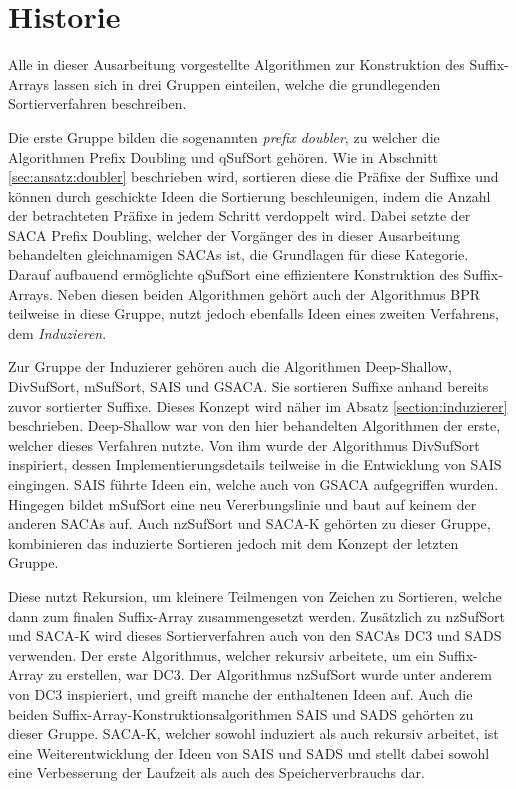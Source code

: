 \section{Historie}
Alle  in dieser Ausarbeitung vorgestellte Algorithmen zur Konstruktion des Suffix-Arrays lassen sich in drei Gruppen einteilen, welche die grundlegenden Sortierverfahren beschreiben. \par
Die erste Gruppe bilden die sogenannten \textit{prefix doubler}, zu welcher die Algorithmen Prefix Doubling und qSufSort gehören.
Wie in Abschnitt \ref{sec:ansatz:doubler} beschrieben wird, sortieren diese die Präfixe der Suffixe und können durch geschickte Ideen die Sortierung beschleunigen, indem die Anzahl der betrachteten Präfixe in jedem Schritt verdoppelt wird. 
Dabei setzte der SACA Prefix Doubling, welcher der Vorgänger des in dieser Ausarbeitung behandelten gleichnamigen SACAs ist, die Grundlagen für diese Kategorie.
Darauf aufbauend ermöglichte qSufSort eine effizientere Konstruktion des Suffix-Arrays. 
Neben diesen beiden Algorithmen gehört auch der Algorithmus BPR teilweise in diese Gruppe, nutzt jedoch ebenfalls Ideen eines zweiten Verfahrens, dem \textit{Induzieren}. \par

Zur Gruppe der Induzierer gehören auch die Algorithmen Deep-Shallow, DivSufSort, mSufSort, SAIS und GSACA.
Sie sortieren Suffixe anhand bereits zuvor sortierter Suffixe.
Dieses Konzept wird näher im Absatz \ref{section:induzierer} beschrieben.
Deep-Shallow war von den hier behandelten Algorithmen der erste, welcher dieses Verfahren nutzte.
Von ihm wurde der Algorithmus DivSufSort inspiriert, dessen Implementierungsdetails teilweise in die Entwicklung von SAIS eingingen.
SAIS führte Ideen ein, welche auch von GSACA aufgegriffen wurden.
Hingegen bildet mSufSort eine neu Vererbungslinie und baut auf keinem der anderen SACAs auf.
Auch nzSufSort und SACA-K gehörten zu dieser Gruppe, kombinieren das induzierte Sortieren jedoch mit dem Konzept der letzten Gruppe. \par

Diese nutzt Rekursion, um kleinere Teilmengen von Zeichen zu Sortieren, welche dann zum finalen Suffix-Array zusammengesetzt werden.
Zusätzlich zu nzSufSort und SACA-K wird dieses Sortierverfahren auch von den SACAs DC3 und SADS verwenden. 
Der erste Algorithmus, welcher rekursiv arbeitete, um ein Suffix-Array zu erstellen, war DC3.
Der Algorithmus nzSufSort wurde unter anderem von DC3 inspieriert, und greift manche der enthaltenen Ideen auf.
Auch die beiden Suffix-Array-Konstruktionsalgorithmen SAIS und SADS gehörten zu dieser Gruppe.
SACA-K, welcher sowohl induziert als auch rekursiv arbeitet, ist eine Weiterentwicklung der Ideen von SAIS und SADS und stellt dabei sowohl eine Verbesserung der Laufzeit als auch des Speicherverbrauchs dar. \par

